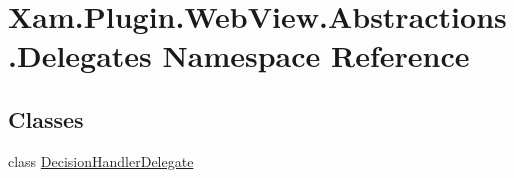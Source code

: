 \hypertarget{namespace_xam_1_1_plugin_1_1_web_view_1_1_abstractions_1_1_delegates}{}\section{Xam.\+Plugin.\+Web\+View.\+Abstractions.\+Delegates Namespace Reference}
\label{namespace_xam_1_1_plugin_1_1_web_view_1_1_abstractions_1_1_delegates}
\subsection*{Classes}
\begin{DoxyCompactItemize}
\item 
class \hyperlink{class_xam_1_1_plugin_1_1_web_view_1_1_abstractions_1_1_delegates_1_1_decision_handler_delegate}{Decision\+Handler\+Delegate}
\end{DoxyCompactItemize}
